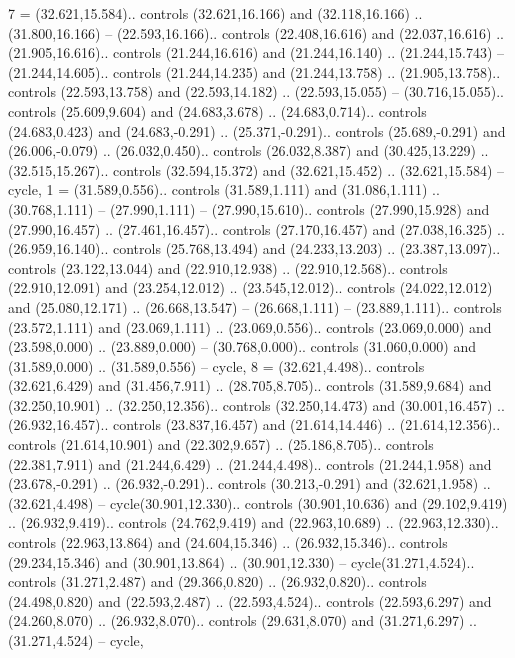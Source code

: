 {7} = {(32.621,15.584).. controls (32.621,16.166) and (32.118,16.166) .. (31.800,16.166) -- (22.593,16.166).. controls (22.408,16.616) and (22.037,16.616) .. (21.905,16.616).. controls (21.244,16.616) and (21.244,16.140) .. (21.244,15.743) -- (21.244,14.605).. controls (21.244,14.235) and (21.244,13.758) .. (21.905,13.758).. controls (22.593,13.758) and (22.593,14.182) .. (22.593,15.055) -- (30.716,15.055).. controls (25.609,9.604) and (24.683,3.678) .. (24.683,0.714).. controls (24.683,0.423) and (24.683,-0.291) .. (25.371,-0.291).. controls (25.689,-0.291) and (26.006,-0.079) .. (26.032,0.450).. controls (26.032,8.387) and (30.425,13.229) .. (32.515,15.267).. controls (32.594,15.372) and (32.621,15.452) .. (32.621,15.584) -- cycle},
{1} = {(31.589,0.556).. controls (31.589,1.111) and (31.086,1.111) .. (30.768,1.111) -- (27.990,1.111) -- (27.990,15.610).. controls (27.990,15.928) and (27.990,16.457) .. (27.461,16.457).. controls (27.170,16.457) and (27.038,16.325) .. (26.959,16.140).. controls (25.768,13.494) and (24.233,13.203) .. (23.387,13.097).. controls (23.122,13.044) and (22.910,12.938) .. (22.910,12.568).. controls (22.910,12.091) and (23.254,12.012) .. (23.545,12.012).. controls (24.022,12.012) and (25.080,12.171) .. (26.668,13.547) -- (26.668,1.111) -- (23.889,1.111).. controls (23.572,1.111) and (23.069,1.111) .. (23.069,0.556).. controls (23.069,0.000) and (23.598,0.000) .. (23.889,0.000) -- (30.768,0.000).. controls (31.060,0.000) and (31.589,0.000) .. (31.589,0.556) -- cycle},
{8} = {(32.621,4.498).. controls (32.621,6.429) and (31.456,7.911) .. (28.705,8.705).. controls (31.589,9.684) and (32.250,10.901) .. (32.250,12.356).. controls (32.250,14.473) and (30.001,16.457) .. (26.932,16.457).. controls (23.837,16.457) and (21.614,14.446) .. (21.614,12.356).. controls (21.614,10.901) and (22.302,9.657) .. (25.186,8.705).. controls (22.381,7.911) and (21.244,6.429) .. (21.244,4.498).. controls (21.244,1.958) and (23.678,-0.291) .. (26.932,-0.291).. controls (30.213,-0.291) and (32.621,1.958) .. (32.621,4.498) -- cycle(30.901,12.330).. controls (30.901,10.636) and (29.102,9.419) .. (26.932,9.419).. controls (24.762,9.419) and (22.963,10.689) .. (22.963,12.330).. controls (22.963,13.864) and (24.604,15.346) .. (26.932,15.346).. controls (29.234,15.346) and (30.901,13.864) .. (30.901,12.330) -- cycle(31.271,4.524).. controls (31.271,2.487) and (29.366,0.820) .. (26.932,0.820).. controls (24.498,0.820) and (22.593,2.487) .. (22.593,4.524).. controls (22.593,6.297) and (24.260,8.070) .. (26.932,8.070).. controls (29.631,8.070) and (31.271,6.297) .. (31.271,4.524) -- cycle},
